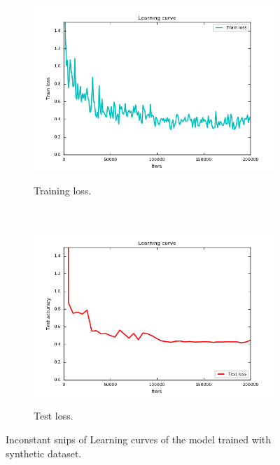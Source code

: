 \begin{figure}[htb!]
    \centering
    \begin{subfigure}[H]{0.5\textwidth}
        \centering
        {\includegraphics[width=1\textwidth]{images/train_U}}
        \caption{Training loss. }
    \end{subfigure}%
    ~ 
    \begin{subfigure}[H]{0.5\textwidth}
        \centering
        {\includegraphics[width=1\textwidth]{images/test_U}}
        \caption{Test loss.}
    \end{subfigure}
    \caption{Inconstant snips of Learning curves of the model trained with synthetic dataset. }
    \label{fig:ucurve}
\end{figure}






